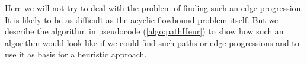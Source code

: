 Here we will not try to deal with the problem of finding such an edge progression. It is likely to be as 
difficult as the acyclic flowbound problem itself. But we describe the algorithm 
in pseudocode (\ref{algo:pathHeur}) to show how such an algorithm would look like if we 
could find such paths or edge progressions and to use it as basis for a heuristic approach.

% 
% 
% 

